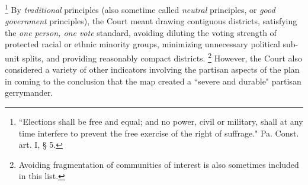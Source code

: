         \footnote{``Elections shall be free and equal; and no power, civil or military, shall at any time interfere to prevent the free exercise of the right of suffrage." Pa. Const. art. I, § 5.}
    By \textit{traditional} principles (also sometime called \textit{neutral} principles, or \textit{good government} principles), the Court meant drawing contiguous districts, satisfying the \textit{one person, one vote} standard, avoiding diluting the voting strength of protected racial or ethnic minority groups, minimizing unnecessary political sub-unit splits, and providing reasonably compact districts.
        \footnote{Avoiding fragmentation of communities of interest is also sometimes included in this list.}
    However, the Court also considered a variety of other indicators involving the partisan aspects of the plan in coming to the conclusion that the map created a ``severe and durable" partisan gerrymander.
